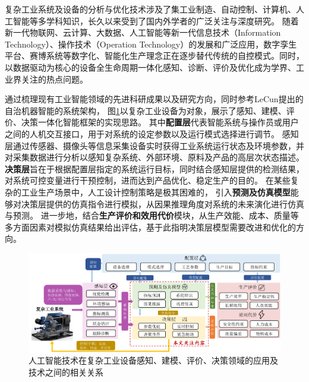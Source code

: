 

复杂工业系统及设备的分析与优化技术涉及了集工业制造、自动控制、计算机、人工智能等多学科知识，长久以来受到了国内外学者的广泛关注与深度研究。
随着新一代物联网、云计算、大数据、人工智能等新一代信息技术（Information Technology）、操作技术（Operation Technology）的发展和广泛应用，数字孪生平台、赛博系统等数字化、智能化生产理念正在逐步替代传统的自控模式。同时，以数据驱动为核心的设备全生命周期一体化感知、诊断、评价及优化成为学界、工业界关注的热点问题。

通过梳理现有工业智能领域的先进科研成果以及研究方向，同时参考LeCun提出的自治机器智能的系统架构\cite{lecun2022path}，
图\ref{fig:industrial_ai}以复杂工业设备为对象，展示了感知、建模、评价、决策一体化智能框架的实现思路。
其中\textbf{配置层}代表智能系统与操作员或用户之间的人机交互接口，用于对系统的设定参数以及运行模式选择进行调节。
感知层通过传感器、摄像头等信息采集设备实时获得工业系统运行状态及环境参数，并对采集数据进行分析以感知复杂系统、外部环境、原料及产品的高层次状态描述。
\textbf{决策层}旨在于根据配置层指定的系统运行目标，同时结合感知层提供的检测结果，对系统可控变量进行干预控制，进而达到产品优化、稳定生产的目的。
在某些复杂的工业生产场景中，人工设计控制策略是极其困难的，
引入\textbf{预测及仿真模型}能够对决策层提供的仿真指令进行模拟，从因果推理角度对系统的未来演化进行仿真与预测。
进一步地，结合\textbf{生产评价和效用代价}模块，从生产效能、成本、质量等多方面因素对模拟仿真结果给出评估，基于此指明决策层模型需要改进和优化的方向。

\begin{figure}
    \includegraphics[width=\linewidth]{figures/chapter1/industrial_ai.pdf}
    \caption{
        人工智能技术在复杂工业设备感知、建模、评价、决策领域的应用及技术之间的相关关系}
    \label{fig:industrial_ai}
\end{figure}

